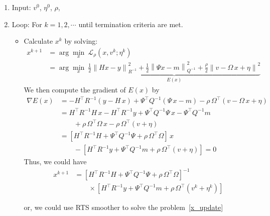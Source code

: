 \documentclass[11pt,a4paper]{article}
\begin{document}
\begin{enumerate}
\item Input: $ v^0$, $\eta^0$, $\rho$,
\item Loop: For $k=1,2,\cdots$ until termination criteria are met.
\begin{itemize}
\item Calculate $x^k $ by solving: 
\begin{equation}
\label{x_update}
\begin{split}
x^{k+1} &= \arg \min_x \  \mathcal{L_\rho}(x,v^k;\eta^k) \\
        &= \arg \min_x \   \underbrace{\frac{1}{2} \left\|  H x- y \right\|_{R^{-1}}^2 
          + \frac{1}{2} \left\| \Psi x - m \right\|_{Q^{-1} }^2
          + \frac{\rho}{2} \left\| v- \Omega\,x + \eta \right\|^2 }_{E(x)}
\end{split}
\end{equation}
We then compute the gradient of $E(x)$ by
%
\begin{equation}
\begin{split}
   \nabla E(x)
   &= -H^\top R^{-1} ( y - H \, x )
   +  \Psi^\top Q^{-1} ( \Psi \, x - m ) 
   - \rho \, \Omega^\top ( v - \Omega \, x + \eta ) \\
   &= H^\top R^{-1} H \, x - H^\top R^{-1} y
   +  \Psi^\top Q^{-1}  \Psi \, x  - \Psi^\top Q^{-1} m  \\
   &\qquad + \rho \, \Omega^\top \Omega \, x - \rho \, \Omega^\top ( v + \eta )  \\
   &= \left[ H^\top R^{-1} H 
   +  \Psi^\top Q^{-1}  \Psi 
   + \rho \, \Omega^\top \Omega \right] \, x  \\
   & \qquad - \left[ H^\top R^{-1} y + \Psi^\top Q^{-1} m + \rho \, \Omega^\top ( v + \eta )  \right]
   = 0
\end{split}
\end{equation}
%
Thus, we could have
%
\begin{equation}
\begin{split}
  x^{k+1} &= \left[ H^\top R^{-1} H 
   +  \Psi^\top Q^{-1}  \Psi 
   + \rho \, \Omega^\top \Omega \right]^{-1} \\
   & \qquad \times \left[ H^\top R^{-1} y + \Psi^\top Q^{-1} m + \rho \, \Omega^\top ( v^k + \eta^k )  \right]
\end{split}
\end{equation}

or, we could use RTS smoother to solve the problem~\eqref{x_update} 


\end{itemize}
\end{enumerate}
\end{document}
